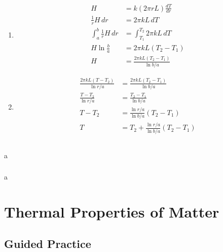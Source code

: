 \documentclass{article}
\begin{document}
\begin{enumerate}
  \item

        \begin{align*}
          H                           & = k (2 \pi r L) \frac{d T}{d r}           \\
          \frac{1}{r} H \,dr          & = 2 \pi k L \,d T                         \\
          \int_a^b \frac{1}{r} H \,dr & = \int_{T_1}^{T_2} 2 \pi k L \,d T        \\
          H \ln \frac{b}{a}           & = 2 \pi k L (T_2 - T_1)                   \\
          H                           & = \frac{2 \pi k L (T_2 - T_1)}{\ln b / a}
        \end{align*}

  \item

        \begin{align*}
          \frac{2 \pi k L (T - T_2)}{\ln r / a} & = \frac{2 \pi k L (T_2 - T_1)}{\ln b / a}       \\
          \frac{T - T_2}{\ln r / a}             & = \frac{T_2 - T_1}{\ln b / a}                   \\
          T - T_2                               & = \frac{\ln r / a}{\ln b / a} (T_2 - T_1)       \\
          T                                     & = T_2 + \frac{\ln r / a}{\ln b / a} (T_2 - T_1) \\
        \end{align*}
\end{enumerate}

\setcounter{subsubsection}{116}
\subsubsection{}

a

\setcounter{subsubsection}{118}
\subsubsection{}

a

\section{Thermal Properties of Matter}

\subsection{Guided Practice}
\end{document}
